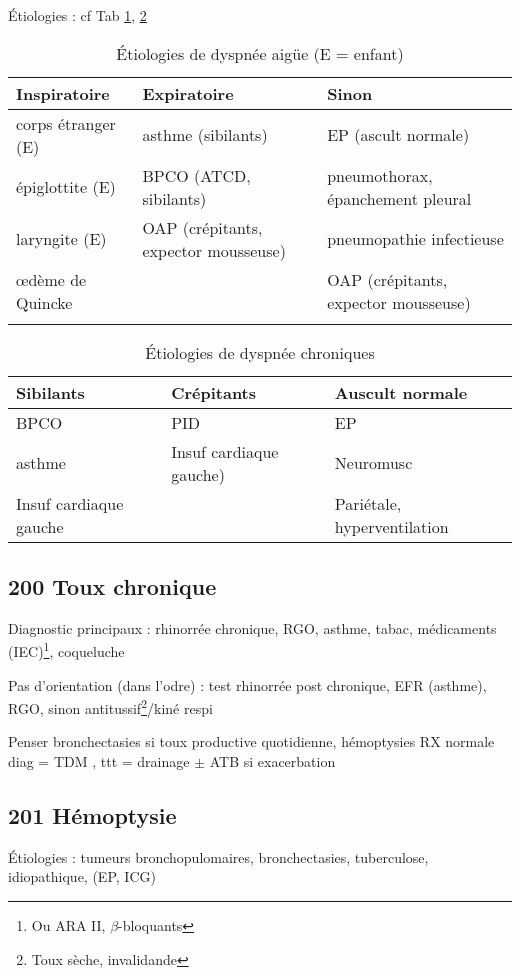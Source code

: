 \documentclass[11pt]{article}
\begin{document}
Étiologies : cf Tab \ref{tab:org902aa45}, \ref{tab:org89d059b}
\begin{table}[htbp]
\caption{\label{tab:org902aa45}Étiologies de dyspnée aigüe (E = enfant)}
\centering
\begin{tabular}{lll}
Inspiratoire & Expiratoire & Sinon\\
\hline
corps étranger (E) & asthme (sibilants) & EP (ascult normale)\\
épiglottite (E) & BPCO (ATCD, sibilants) & pneumothorax, épanchement pleural\\
laryngite (E) & OAP (crépitants, expector mousseuse) & pneumopathie infectieuse\\
\oe{}dème de Quincke &  & OAP (crépitants, expector mousseuse)\\
 &  & \\
\end{tabular}
\end{table}
\begin{table}[htbp]
\caption{\label{tab:org89d059b}Étiologies de dyspnée chroniques}
\centering
\begin{tabular}{lll}
Sibilants & Crépitants & Auscult normale\\
\hline
BPCO & PID & EP\\
asthme & Insuf cardiaque gauche) & Neuromusc\\
Insuf cardiaque gauche &  & Pariétale, hyperventilation\\
\end{tabular}
\end{table}

\subsection{200 Toux chronique}
\label{sec:orga69aa40}
Diagnostic principaux : rhinorrée chronique, RGO, asthme, tabac, médicaments (IEC)\footnote{Ou ARA II, \(\beta\)-bloquants}, coqueluche

Pas d'orientation (dans l'odre) : test rhinorrée post chronique, EFR (asthme),
RGO, sinon antitussif\footnote{Toux sèche, invalidande}/kiné respi

Penser bronchectasies si toux productive quotidienne, hémoptysies RX normale
\thus diag = TDM , ttt = drainage \(\pm\) ATB si exacerbation
\subsection{201 Hémoptysie}
\label{sec:orgf26ec33}
Étiologies : tumeurs bronchopulomaires, bronchectasies, tuberculose,
idiopathique, (EP, ICG)
\end{document}

